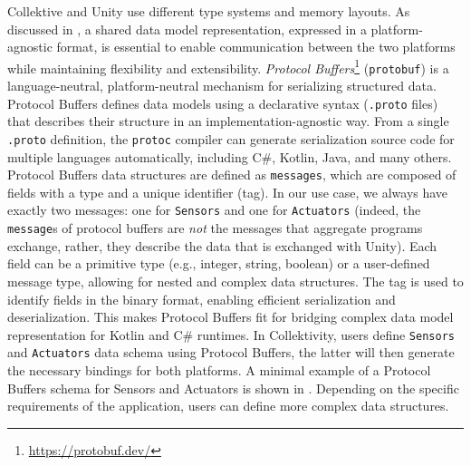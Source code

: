 Collektive and Unity use different type systems and memory layouts.
%
As discussed in ,
a shared data model representation,
expressed in a platform-agnostic format, 
is essential to enable communication between the two platforms while maintaining flexibility and extensibility.
%
%
%
%
\emph{Protocol Buffers}\footnote{\url{https://protobuf.dev/}} (\texttt{protobuf}) is a language-neutral,
platform-neutral mechanism for serializing structured data.
%
Protocol Buffers defines data models using a declarative syntax (\texttt{.proto} files)
that describes their structure in an implementation-agnostic way.
%
From a single \texttt{.proto} definition,
the \texttt{protoc} compiler can generate serialization source code for multiple languages automatically,
including C\#, Kotlin, Java, and many others.
%
Protocol Buffers data structures are defined as \texttt{messages},
which are composed of fields with a type and a unique identifier (tag).
%
In our use case,
we always have exactly two messages: one for \texttt{Sensors} and one for \texttt{Actuators}
(indeed, the \texttt{message}s of protocol buffers are \emph{not} the messages that aggregate programs exchange,
rather, they describe the data that is exchanged with Unity).
%
Each field can be a primitive type (e.g., integer, string, boolean)
or a user-defined message type,
allowing for nested and complex data structures.
%
The tag is used to identify fields in the binary format, 
enabling efficient serialization and deserialization.
%
This makes Protocol Buffers fit for bridging complex data model representation for Kotlin and C\# runtimes.
%
In Collektivity, 
users define \texttt{Sensors} and \texttt{Actuators} data schema using Protocol Buffers,
the latter will then generate the necessary bindings for both platforms.
%
A minimal example of a Protocol Buffers schema for Sensors and Actuators is shown in .
%
Depending on the specific requirements of the application,
users can define more complex data structures.

